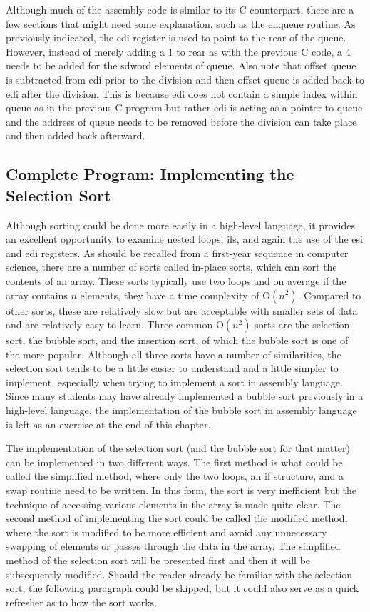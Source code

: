 \documentclass[10pt]{book}
\begin{document}
Although much of the assembly code is similar to its C counterpart, there are a few sections that might need some explanation, such as the enqueue routine. As previously indicated, the edi register is used to point to the rear of the queue. However, instead of merely adding a 1 to rear as with the previous C code, a 4\\

needs to be added for the sdword elements of queue. Also note that offset queue is subtracted from edi prior to the division and then offset queue is added back to edi after the division. This is because edi does not contain a simple index within queue as in the previous C program but rather edi is acting as a pointer to queue and the address of queue needs to be removed before the division can take place and then added back afterward.


\subsection{Complete Program: Implementing the Selection Sort}
Although sorting could be done more easily in a high-level language, it provides an excellent opportunity to examine nested loops, ifs, and again the use of the esi and edi registers. As should be recalled from a first-year sequence in computer science, there are a number of sorts called in-place sorts, which can sort the contents of an array. These sorts typically use two loops and on average if the array contains $n$ elements, they have a time complexity of $\mathrm{O}\left(n^{2}\right)$. Compared to other sorts, these are relatively slow but are acceptable with smaller sets of data and are relatively easy to learn. Three common $\mathrm{O}\left(n^{2}\right)$ sorts are the selection sort, the bubble sort, and the insertion sort, of which the bubble sort is one of the more popular. Although all three sorts have a number of similarities, the selection sort tends to be a little easier to understand and a little simpler to implement, especially when trying to implement a sort in assembly language. Since many students may have already implemented a bubble sort previously in a high-level language, the implementation of the bubble sort in assembly language is left as an exercise at the end of this chapter.

The implementation of the selection sort (and the bubble sort for that matter) can be implemented in two different ways. The first method is what could be called the simplified method, where only the two loops, an if structure, and a swap routine need to be written. In this form, the sort is very inefficient but the technique of accessing various elements in the array is made quite clear. The second method of implementing the sort could be called the modified method, where the sort is modified to be more efficient and avoid any unnecessary swapping of elements or passes through the data in the array. The simplified method of the selection sort will be presented first and then it will be subsequently modified. Should the reader already be familiar with the selection sort, the following paragraph could be skipped, but it could also serve as a quick refresher as to how the sort works.
\end{document}

